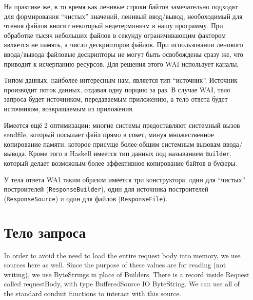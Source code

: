 На практике же, в то время как ленивые строки байтов замечательно подходят для формирования
``чистых'' значений, ленивый ввод/вывод, необоходимый для чтения файлов вносит некоторый
недетерминизм в нашу программу. При обработке тысяч небольших файлов в секунду ограничивающим
фактором является не память, а число дескрипторов файлов. При использовании ленивого
ввода/вывода файловые дескрипторы не могут быть освобождены сразу же, что приводит к
исчерпанию ресурсов. Для решения этого WAI использует каналы.


Типом данных, наиболее интересным нам, является тип ``источник''. Источник производит
поток данных, отдавая одну порцию за раз. В случае WAI, тело запроса будет источником,
передаваемым приложению, а тело ответа будет источником, возвращаемым из приложения.

Имеется ещё 2 оптимизации: многие системы предоставляют системный вызов sendfile, который
посылает файл прямо в сокет, минуя множественное копирование памяти, которое присуще
более общим системным вызовам ввода/вывода. Кроме того в Haskell имеется тип данных
под называнием \lstinline!Builder!, который делает возможным более эффективное копирование
байтов в буферы.

У тела ответа WAI таким образом имеется три конструктора: один для ``чистых'' построителей
(\lstinline!ResponseBuilder!), один для источника построителей (\lstinline!ResponseSource!) и
один для файлов (\lstinline!ResponseFile!).

\section {Тело запроса}

In order to avoid the need to load the entire request body into memory, we use
sources here as well. Since the purpose of these values are for reading (not writing),
we use ByteStrings in place of Builders. There is a record inside Request called
requestBody, with type BufferedSource IO ByteString. We can use all of the standard 
conduit functions to interact with this source.

